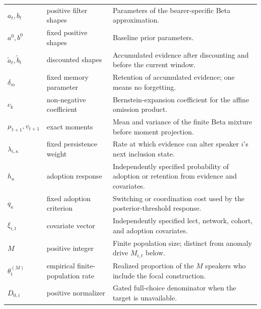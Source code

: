 \begin{longtable}{@{}>{\raggedright\arraybackslash}p{}
  >{\raggedright\arraybackslash}p{}
  >{\raggedright\arraybackslash}p{}@{}}
$a_t,b_t$ & positive filter shapes & Parameters of the bearer-specific Beta approximation. \\
$a^0,b^0$ & fixed positive shapes & Baseline prior parameters. \\
$\widetilde a_t,\widetilde b_t$ & discounted shapes & Accumulated evidence after discounting and before the current window. \\
$\delta_m$ & fixed memory parameter & Retention of accumulated evidence; one means no forgetting. \\
$c_k$ & non-negative coefficient & Bernstein-expansion coefficient for the affine omission product. \\
$\mu_{t+1},v_{t+1}$ & exact moments & Mean and variance of the finite Beta mixture before moment projection. \\
$\lambda_{i,\kappa}$ & fixed persistence weight & Rate at which evidence can alter speaker $i$'s next inclusion state. \\
$h_\kappa$ & adoption response & Independently specified probability of adoption or retention from evidence and covariates. \\
$q_\kappa$ & fixed adoption criterion & Switching or coordination cost used by the posterior-threshold response. \\
$\xi_{i,t}$ & covariate vector & Independently specified lect, network, cohort, and adoption covariates. \\
$M$ & positive integer & Finite population size; distinct from anomaly drive $M_{i,t}$ below. \\
$\theta_t^{(M)}$ & empirical finite-population rate & Realized proportion of the $M$ speakers who include the focal construction. \\
$D_{0,i}$ & positive normalizer & Gated full-choice denominator when the target is unavailable. \\


\end{longtable}
